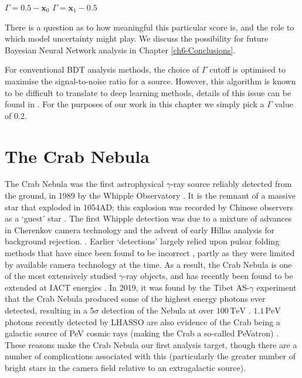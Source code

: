 \begin{algorithmic}
    \STATE $\Gamma=0.5-\textbf{x}_0$
    \ELSE
    \STATE $\Gamma=\textbf{x}_1-0.5$
    \ENDIF
\end{algorithmic}
There is a question as to how meaningful this particular score is, and the role to which model uncertainty might play. We discuss the possibility for future Bayesian Neural Network analysis in Chapter \ref{ch6-Conclusions}.

For conventional BDT analysis methods, the choice of $\Gamma$ cutoff is optimised to maximise the signal-to-noise ratio for a source. However, this algorithm is known to be difficult to translate to deep learning methods, details of this issue can be found in \cite{Shilon}. For the purposes of our work in this chapter we simply pick a $\Gamma$ value of 0.2.

\section{The Crab Nebula}
The Crab Nebula was the first astrophysical $\gamma$-ray source reliably detected from the ground, in 1989 by the Whipple Observatory \cite{weekestev}. It is the remnant of a massive star that exploded in 1054AD; this explosion was recorded by Chinese observers as a `guest' star \cite{lhassocrab}. The first Whipple detection was due to a mixture of advances in Cherenkov camera technology and the advent of early Hillas analysis for background rejection. \cite{hillasparams}. Earlier `detections' largely relied upon pulsar folding methods that have since been found to be incorrect \cite{paulathesis}, partly as they were limited by available camera technology at the time. As a result, the Crab Nebula is one of the most extensively studied $\gamma$-ray objects, and has recently been found to be extended at IACT energies \cite{holler}. In 2019, it was found by the Tibet AS-$\gamma$ experiment that the Crab Nebula produced some of the highest energy photons ever detected, resulting in a 5$\sigma$ detection of the Nebula at over $\mathrm{100\,TeV}$ \cite{asgamma}. $\mathrm{1.1\,PeV}$ photons recently detected by LHASSO are also evidence of the Crab being a galactic source of PeV cosmic rays (making the Crab a so-called PeVatron) \cite{lhassocrab}. These reasons make the Crab Nebula our first analysis target, though there are a number of complications associated with this (particularly the greater number of bright stars in the camera field relative to an extragalactic source).

